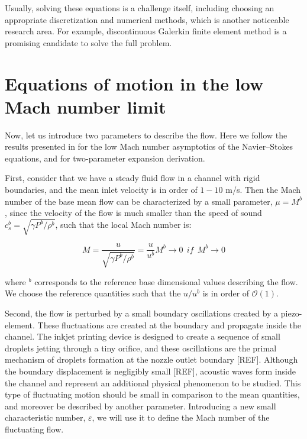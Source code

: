 Usually, solving these equations is a challenge itself, including choosing an appropriate discretization and numerical methods, which is another noticeable research area. For example, discontinuous Galerkin finite element method \cite{hartmann2008} is a promising candidate to solve the full problem.

\section{Equations of motion in the low Mach number limit}

Now, let us introduce two parameters to describe the flow. Here we follow the results presented in \cite{Muller99lowmach} for the low Mach number asymptotics of the Navier--Stokes equations, and \cite{culick2006unsteady} for two-parameter expansion derivation. 

First, consider that we have a steady fluid flow in a channel with rigid boundaries, and the mean inlet velocity is in order of $1-10$ m/s. Then the Mach number of the base mean flow can be characterized by a small parameter, $\mu = M^b$, since the velocity of the flow is much smaller than the speed of sound $c_s^b = \sqrt{\gamma P^{b}/\rho^{b}}$, such that the local Mach number is:

\begin{equation}
M = \frac{u}{\sqrt{\gamma P^{b}/\rho^{b}}} = \frac{u}{u^{b}} M^{b} \rightarrow 0 \ \ if \ \ M^{b} \rightarrow 0
\end{equation}

\noindent where $^b$ corresponds to the reference base dimensional values describing the flow. We choose the reference quantities such that the $u/u^{b}$ is in order of $\mathcal{O}(1)$.

Second, the flow is perturbed by a small boundary oscillations created by a piezo-element. These fluctuations are created at the boundary and propagate inside the channel. The inkjet printing device is designed to create a sequence of small droplets jetting through a tiny orifice, and these oscillations are the primal mechanism of droplets formation at the nozzle outlet boundary [REF]. Although the boundary displacement is negligibly small [REF], acoustic waves form inside the channel and represent an additional physical phenomenon to be studied. This type of fluctuating motion should be small in comparison to the mean quantities, and moreover be described by another parameter. Introducing a new small characteristic number, $\varepsilon$, we will use it to define the Mach number of the fluctuating flow.

